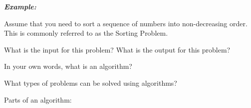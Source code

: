\documentclass[12pt]{article}
\theoremstyle{definition}
\begin{document}
\vskip 0.25cm

\textbf{\emph{Example:}}

Assume that you need to sort a sequence of numbers into non-decreasing order. This is commonly referred to as the Sorting Problem. 

What is the input for this problem?
\vskip 3cm
What is the output for this problem?
\vskip 3cm




In your own words, what is an algorithm?
\vskip 3cm


What types of problems can be solved using algorithms?


\vskip 3cm

\newpage
Parts of an algorithm:
\end{document}
